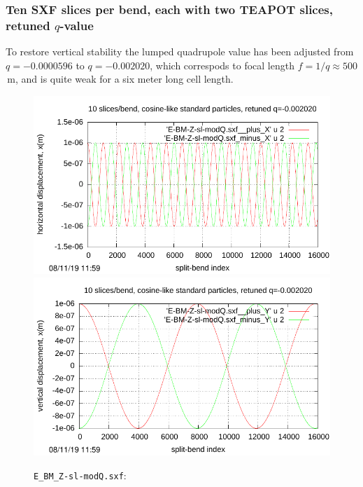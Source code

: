 \documentclass[12pt]{article}
\begin{document}
\subsubsection{Ten SXF slices per bend, each with two TEAPOT slices, retuned $q$-value\label{sect:pre-sliced-modQ} }
To restore vertical stability the lumped quadrupole value has been adjusted from
$q=-0.0000596$ to $q=-0.002020$, which correspods to focal length $f=1/q\approx500$\,m,
and is quite weak for a six meter long cell length.
\begin{figure}[htbp] 
  \includegraphics[scale=1.0]{pdf/Fig_I-3-sl-modQ-t.pdf} 
  \includegraphics[scale=1.0]{pdf/Fig_I-3-sl-modQ-b.pdf} 
\caption{{\tt E\_BM\_Z-sl-modQ.sxf}: }
\end{figure}


\clearpage
\end{document}

